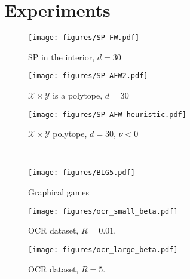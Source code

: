\documentclass[twoside]{article}
\newcommand{\X}{\mathcal{X}}
\newcommand{\Y}{\mathcal{Y}}
\newcommand{\M}{\X \times \Y}
\newcommand{\CondNumb}{\nu}
\newcommand{\FW}{{\hspace{0.05em}\textnormal{FW}}}
\newcommand{\0}{\mathbf{0}} %
\begin{document}
%
%
%
%
%
%
%
%
%

%
%
%

%
%
%
%
%
%
%
%
%
%
%
%
%
%



\section{Experiments}\label{sec:experiments}

\begin{figure*}
    \centering
    \begin{subfigure}[t]{0.32\linewidth}
        \centering
        \texttt{[image: figures/SP-FW.pdf]}
        \caption{SP in the interior, $d=30$}
        \label{fig:conv_int}
    \end{subfigure}
    \;
    \begin{subfigure}[t]{0.32\linewidth}
        \centering
        \texttt{[image: figures/SP-AFW2.pdf]}
        \caption{$\M$ is a polytope, $d=30$}
        \label{fig:conv_geom}
    \end{subfigure}
    \;
    \begin{subfigure}[t]{0.32\linewidth}
        \centering
        \texttt{[image: figures/SP-AFW-heuristic.pdf]}
        \caption{$\M$ polytope, $d=30$, $\CondNumb<0$}
        \label{fig:better_step_size}
    \end{subfigure}
    \\
    \begin{subfigure}[t]{0.32\linewidth}
        \centering
        \texttt{[image: figures/BIG5.pdf]}
        \caption{Graphical games}
        \label{fig:graphical}
    \end{subfigure} %
    \;
    \begin{subfigure}[t]{0.32\linewidth}
        \centering
        \texttt{[image: figures/ocr\_small\_beta.pdf]}
        \caption{OCR dataset, $R=0.01$.}
        \label{fig:beta_small}
    \end{subfigure}
    \;
    \begin{subfigure}[t]{0.32\linewidth}
        \centering
        \texttt{[image: figures/ocr\_large\_beta.pdf]}
        \caption{OCR dataset, $R=5$.}
        \label{fig:beta_big}
    \end{subfigure}
    \caption{\small On Figures~\ref{fig:conv_int}, \ref{fig:conv_geom} and~\ref{fig:better_step_size}, we plot on a semilog scale the best gap observed $\min_{s\leq t} g^\FW_s$ as a function of $t$. For experiments~\ref{fig:graphical}, \ref{fig:beta_small} and~\ref{fig:beta_big}, the objective function is bilinear and the convergence is sublinear. An effective pass is one iteration for SP-FW or the subgradient method and $n$ iterations for SP-BCFW or SSG.
    We give more details about these experiments in Appendix~\ref{sec:details_on_the_experiments}.
    }
    \vspace{-2mm}
\end{figure*}
\end{document}
